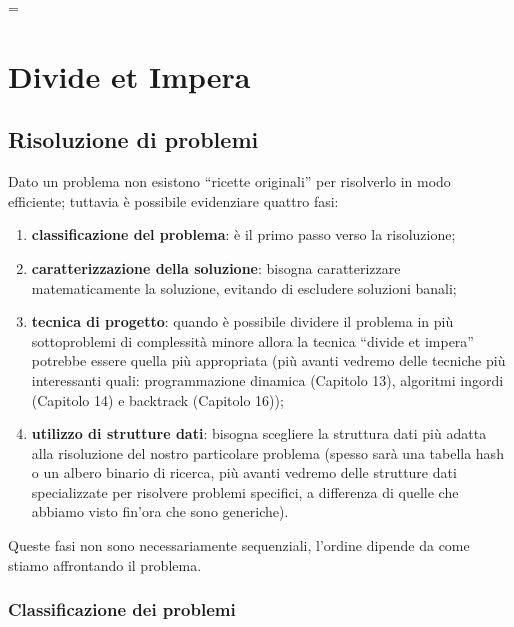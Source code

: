 
\ifsubfile
\hfuzz=\maxdimen\newdimen\hfuzz
\usepackage{silence}
\WarningsOff[caption]

\pagestyle{plain}
\setcounter{chapter}{11}


\fi
\chapter{Divide et Impera}

\section{Risoluzione di problemi}

Dato un problema non esistono \enquote{ricette originali} per risolverlo in modo efficiente;
tuttavia è possibile evidenziare quattro fasi:
\begin{enumerate}
	\item \textbf{classificazione del problema}: è il primo passo verso la risoluzione;
	\item \textbf{caratterizzazione della soluzione}: bisogna caratterizzare matematicamente la soluzione, evitando di escludere soluzioni banali;
	\item \textbf{tecnica di progetto}: quando è possibile dividere il problema in più sottoproblemi di complessità minore allora la tecnica \enquote{divide et impera} potrebbe essere quella più appropriata (più avanti vedremo delle tecniche più interessanti quali: programmazione dinamica (Capitolo 13), algoritmi ingordi (Capitolo 14) e backtrack (Capitolo 16));
	\item \textbf{utilizzo di strutture dati}: bisogna scegliere la struttura dati più adatta alla risoluzione del nostro particolare problema (spesso sarà una tabella hash o un albero binario di ricerca, più avanti vedremo delle strutture dati specializzate per risolvere problemi specifici, a differenza di quelle che abbiamo visto fin'ora che sono generiche).
\end{enumerate}
Queste fasi non sono necessariamente sequenziali, l'ordine dipende da come stiamo affrontando il problema.

\subsection{Classificazione dei problemi}

